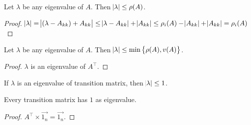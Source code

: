 \begin{theorem}
    Let $\lambda$ be any eigenvalue of $A$. Then $\abs{\lambda} \leq \rho(A)$.
\end{theorem}
\begin{proof}
    $\displaystyle \abs{\lambda} = \abs{(\lambda - A_{kk}) + A_{kk}} \leq \abs{\lambda - A_{kk}} + \abs{A_{kk}} \leq \rho_i (A) - \abs{A_{kk}}  + \abs{A_{kk}}  = \rho_i (A)$
\end{proof}

\begin{theorem}
    Let $\lambda$ be any eigenvalue of $A$. Then $\abs{\lambda} \leq \min \set{\rho(A), v(A)}$.
\end{theorem}
\begin{proof}
    $\lambda$ is an eigenvalue of $A^\top$.
\end{proof}

\begin{theorem}
    If $\lambda$ is an eigenvalue of transition matrix, then $\abs{\lambda} \leq 1$.
\end{theorem}

\begin{theorem}
    Every transition matrix has $1$ as eigenvalue.    
\end{theorem}
\begin{proof}
    $A^\top \times  \vec{1_n} = \vec{1_n}$.
\end{proof}

